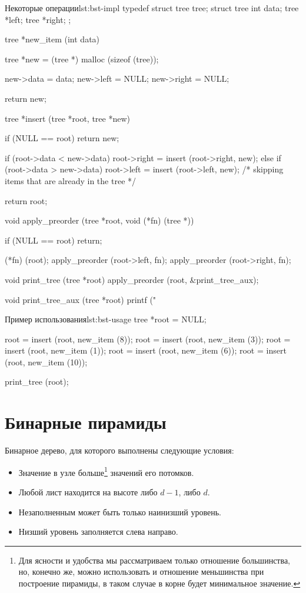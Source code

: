 \begin{clst}{Некоторые операции}{lst:bst-impl}
typedef struct tree tree;
struct tree {
  int data;
  tree *left;
  tree *right;
};

tree *new_item (int data) {
  tree *new = (tree *) malloc (sizeof (tree));

  new->data = data;
  new->left = NULL;
  new->right = NULL;

  return new;
}

tree *insert (tree *root, tree *new) {
  if (NULL == root)
    return new;

  if (root->data < new->data)
    root->right = insert (root->right, new);
  else if (root->data > new->data)
    root->left = insert (root->left, new);
  /* skipping items that are already in the tree */

  return root;
}

void apply_preorder (tree *root, void (*fn) (tree *)) {
  if (NULL == root)
    return;

  (*fn) (root);
  apply_preorder (root->left, fn);
  apply_preorder (root->right, fn);
}

void print_tree (tree *root) {
  apply_preorder (root, &print_tree_aux);
}

void print_tree_aux (tree *root) {
  printf ("%
}
\end{clst}

\begin{clst}{Пример использования}{lst:bst-usage}
tree *root = NULL;

root = insert (root, new_item (8));
root = insert (root, new_item (3));
root = insert (root, new_item (1));
root = insert (root, new_item (6));
root = insert (root, new_item (10));

print_tree (root);
\end{clst}

\section{Бинарные пирамиды}
\label{sec:bin-heaps}

Бинарное дерево, для которого выполнены следующие условия:
\begin{itemize}
  \item Значение в узле больше\footnote{Для ясности и удобства мы рассматриваем только отношение большинства, но, конечно же, можно использовать и отношение меньшинства при построение пирамиды, в таком случае в корне будет минимальное значение.} значений его потомков.
  \item Любой лист находится на высоте либо $d - 1$, либо $d$.
  \item Незаполненным может быть только наинизший уровень.
  \item Низший уровень заполняется слева направо.
\end{itemize}

